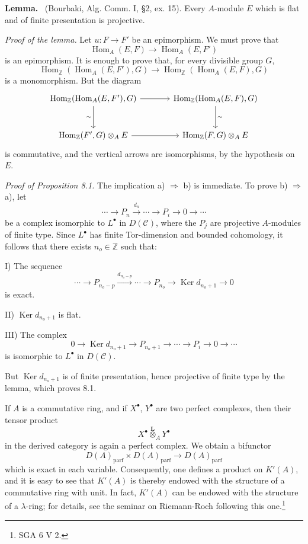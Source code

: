 \documentclass[11pt]{article}
\newenvironment{statement}[1]{\par\medskip\noindent\textbf{#1.}\ }{\par\medskip}
\DeclareMathOperator{\Hom}{Hom}
\providecommand{\Ker}{\operatorname{Ker}}
\providecommand{\parf}{\mathrm{parf}}
\providecommand{\Hom}{\operatorname{Hom}}
\providecommand{\cC}{\mathcal C}
\providecommand{\Ker}{\operatorname{Ker}}
\providecommand{\Ker}{\operatorname{Ker}}
\providecommand{\cC}{\mathcal C}
\providecommand{\parf}{\mathrm{parf}}
\providecommand{\Hom}{\operatorname{Hom}}
\begin{document}
\begin{statement}{Lemma}
(Bourbaki, Alg. Comm. I, §2, ex. 15). Every $A$-module $E$ which is flat and of finite presentation is projective.
\end{statement}

\emph{Proof of the lemma.} Let $u:F\to F'$ be an epimorphism. We must prove that
\[
\Hom_A(E,F)\longrightarrow\Hom_A(E,F')
\]
is an epimorphism. It is enough to prove that, for every divisible group $G$,
\[
\Hom_{\mathbb Z}(\Hom_A(E,F'),G)\longrightarrow
\Hom_{\mathbb Z}(\Hom_A(E,F),G)
\]
is a monomorphism. But the diagram
\[
\begin{tikzcd}[column sep=large,row sep=large]
\Hom_{\mathbb Z}(\Hom_A(E,F'),G)
 \arrow[r]\arrow[d,"\sim"']&
\Hom_{\mathbb Z}(\Hom_A(E,F),G)\arrow[d,"\sim"]\\
\Hom_{\mathbb Z}(F',G)\otimes_A E
 \arrow[r]&
\Hom_{\mathbb Z}(F,G)\otimes_A E
\end{tikzcd}
\]
is commutative, and the vertical arrows are isomorphisms, by the hypothesis on $E$.

\emph{Proof of Proposition 8.1.} The implication a) $\Rightarrow$ b) is immediate. To prove b) $\Rightarrow$ a), let
\[
\cdots\longrightarrow P_n\xrightarrow{d_n}\cdots\longrightarrow P_i\longrightarrow 0\longrightarrow\cdots
\]
be a complex isomorphic to $L^\bullet$ in $D(\cC)$, where the $P_j$ are projective $A$-modules of finite type. Since $L^\bullet$ has finite Tor-dimension and bounded cohomology, it follows that there exists $n_o\in\mathbb Z$ such that:

I) The sequence
\[
\cdots\longrightarrow P_{n_o-p}\xrightarrow{d_{n_o-p}}\cdots\longrightarrow
P_{n_o}\longrightarrow \Ker d_{n_o+1}\longrightarrow0
\]
is exact.

II) $\Ker d_{n_o+1}$ is flat.

III) The complex
\[
0\longrightarrow \Ker d_{n_o+1}\longrightarrow P_{n_o+1}\longrightarrow\cdots\longrightarrow P_i\longrightarrow0\longrightarrow\cdots
\]
is isomorphic to $L^\bullet$ in $D(\cC)$.

But $\Ker d_{n_o+1}$ is of finite presentation, hence projective of finite type by the lemma, which proves 8.1.

If $A$ is a commutative ring, and if $X^\bullet$, $Y^\bullet$ are two perfect complexes, then their tensor product
\[
X^\bullet\overset{\mathbf L}{\otimes}_A Y^\bullet
\]
in the derived category is again a perfect complex. We obtain a bifunctor
\[
D(A)_{\parf}\times D(A)_{\parf}\longrightarrow D(A)_{\parf}
\]
which is exact in each variable. Consequently, one defines a product on $K'(A)$, and it is easy to see that $K'(A)$ is thereby endowed with the structure of a commutative ring with unit. In fact, $K'(A)$ can be endowed with the structure of a $\lambda$-ring; for details, see the seminar on Riemann-Roch following this one.\footnote{SGA 6 V 2.}
\end{document}
